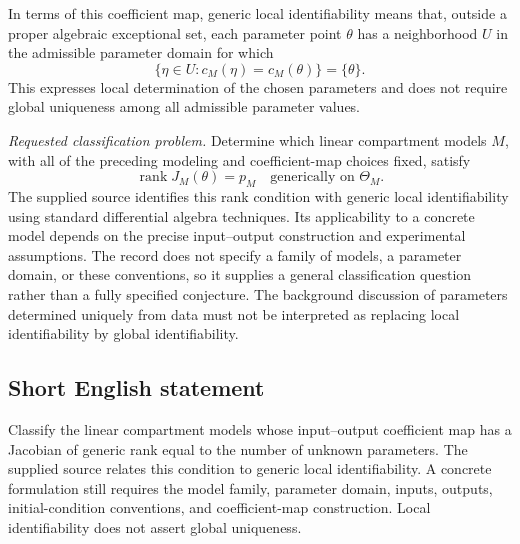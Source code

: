 \documentclass[11pt]{article}
\begin{document}
In terms of this coefficient map, generic local identifiability means that, outside a proper algebraic exceptional set, each parameter point \(\theta\) has a neighborhood \(U\) in the admissible parameter domain for which
\[
\{\eta\in U:c_M(\eta)=c_M(\theta)\}=\{\theta\}.
\]
This expresses local determination of the chosen parameters and does not require global uniqueness among all admissible parameter values.

\emph{Requested classification problem.} Determine which linear compartment models \(M\), with all of the preceding modeling and coefficient-map choices fixed, satisfy
\[
\operatorname{rank}J_M(\theta)=p_M
\quad\text{generically on }\Theta_M.
\]
The supplied source identifies this rank condition with generic local identifiability using standard differential algebra techniques. Its applicability to a concrete model depends on the precise input--output construction and experimental assumptions. The record does not specify a family of models, a parameter domain, or these conventions, so it supplies a general classification question rather than a fully specified conjecture. The background discussion of parameters determined uniquely from data must not be interpreted as replacing local identifiability by global identifiability.
\subsection{Short English statement}
Classify the linear compartment models whose input--output coefficient map has a Jacobian of generic rank equal to the number of unknown parameters. The supplied source relates this condition to generic local identifiability. A concrete formulation still requires the model family, parameter domain, inputs, outputs, initial-condition conventions, and coefficient-map construction. Local identifiability does not assert global uniqueness.
\end{document}
